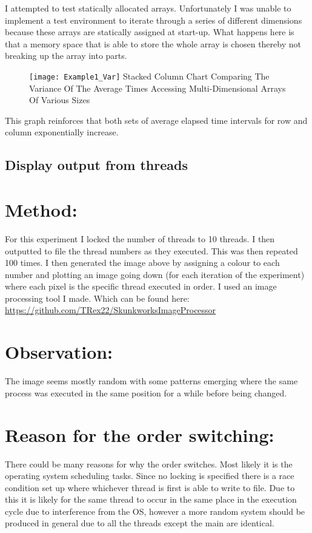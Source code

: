 \documentclass[11pt]{article}
\begin{document}
\begin{page}
\noindent I attempted to test statically allocated arrays. Unfortunately I was unable to implement a test environment to iterate through a series of different dimensions because these arrays are statically assigned at start-up. What happens here is that a memory space that is able to store the whole array is chosen thereby not breaking up the array into parts. 

\begin{figure}[ht]
\centering
     \texttt{[image: Example1\_Var]}
     Stacked Column Chart Comparing The Variance Of The Average Times Accessing Multi-Dimensional Arrays Of Various Sizes 

\end{figure}

\noindent This graph reinforces that both sets of average elapsed time intervals for row and column exponentially increase.

\section{Display output from threads}
\noindent \chapter{Method:}
For this experiment I locked the number of threads to 10 threads. I then outputted to file the thread numbers as they executed. This was then repeated 100 times. I then generated the image above by assigning a colour to each number and plotting an image going down (for each iteration of the experiment) where each pixel is the specific thread executed in order. I used an image processing tool I made. Which can be found here: \url{ https://github.com/TRex22/SkunkworksImageProcessor}

\noindent \chapter{Observation:}
The image seems mostly random with some patterns emerging where the same process was executed in the same position for a while before being changed.

\noindent \chapter{Reason for the order switching:}
There could be many reasons for why the order switches. Most likely it is the operating system scheduling tasks. Since no locking is specified there is a race condition set up where whichever thread is first is able to write to file. Due to this it is likely for the same thread to occur in the same place in the execution cycle due to interference from the OS, however a more random system should be produced in general due to all the threads except the main are identical.\\


\end{page}
\end{document}
